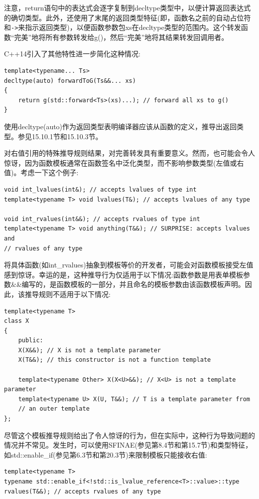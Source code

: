 注意，return语句中的表达式会逐字复制到decltype类型中，以便计算返回表达式的确切类型。此外，还使用了末尾的返回类型特征(即，函数名之前的自动占位符和\texttt{->}来指示返回类型)，以便函数参数包xs在decltype类型的范围内。这个转发函数“完美”地将所有参数转发给g()，然后“完美”地将其结果转发回调用者。

C++14引入了其他特性进一步简化这种情况:

\begin{lstlisting}[style=styleCXX]
template<typename... Ts>
decltype(auto) forwardToG(Ts&&... xs)
{
	return g(std::forward<Ts>(xs)...); // forward all xs to g()
}
\end{lstlisting}

使用decltype(auto)作为返回类型表明编译器应该从函数的定义，推导出返回类型。参见15.10.1节和15.10.3节。


对右值引用的特殊推导规则结果，对完善转发具有重要意义。然而，也可能会令人惊讶，因为函数模板通常在函数签名中泛化类型，而不影响参数类型(左值或右值)。考虑一下这个例子:

\begin{lstlisting}[style=styleCXX]
void int_lvalues(int&); // accepts lvalues of type int
template<typename T> void lvalues(T&); // accepts lvalues of any type

void int_rvalues(int&&); // accepts rvalues of type int
template<typename T> void anything(T&&); // SURPRISE: accepts lvalues and
// rvalues of any type
\end{lstlisting}

将具体函数(如int\_rvalues)抽象到模板等价的开发者，可能会对函数模板接受左值感到惊讶。幸运的是，这种推导行为仅适用于以下情况:函数参数是用表单模板参数\&\&编写的，是函数模板的一部分，并且命名的模板参数由该函数模板声明。因此，该推导规则不适用于以下情况:

\begin{lstlisting}[style=styleCXX]
template<typename T>
class X
{
	public:
	X(X&&); // X is not a template parameter
	X(T&&); // this constructor is not a function template
	
	template<typename Other> X(X<U>&&); // X<U> is not a template parameter
	template<typename U> X(U, T&&); // T is a template parameter from
	// an outer template
};
\end{lstlisting}

尽管这个模板推导规则给出了令人惊讶的行为，但在实际中，这种行为导致问题的情况并不常见。发生时，可以使用SFINAE(参见第8.4节和第15.7节)和类型特征，如std::enable\_if(参见第6.3节和第20.3节)来限制模板只能接收右值:

\begin{lstlisting}[style=styleCXX]
template<typename T>
typename std::enable_if<!std::is_lvalue_reference<T>::value>::type
rvalues(T&&); // accepts rvalues of any type
\end{lstlisting}


























